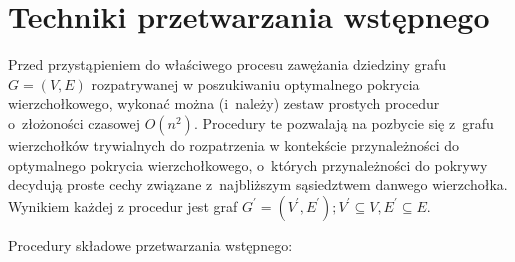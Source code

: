 \section{Techniki przetwarzania wstępnego}\label{Section_preprocessing}

Przed przystąpieniem do właściwego procesu zawężania dziedziny grafu $G=(V,E)$
rozpatrywanej w poszukiwaniu optymalnego pokrycia wierzchołkowego, wykonać można 
(i~należy) zestaw prostych procedur o~złożoności czasowej $O(n^2)$.
Procedury te pozwalają na pozbycie się z~grafu wierzchołków trywialnych do 
rozpatrzenia w kontekście przynależności do optymalnego pokrycia wierzchołkowego,
o~których przynależności do pokrywy decydują proste cechy związane
z~najbliższym sąsiedztwem danwego wierzchołka.
Wynikiem każdej z procedur jest graf $G^\prime=(V^\prime, E^\prime); V^\prime
\subseteq V, E^\prime \subseteq E$.


Procedury składowe przetwarzania wstępnego:

